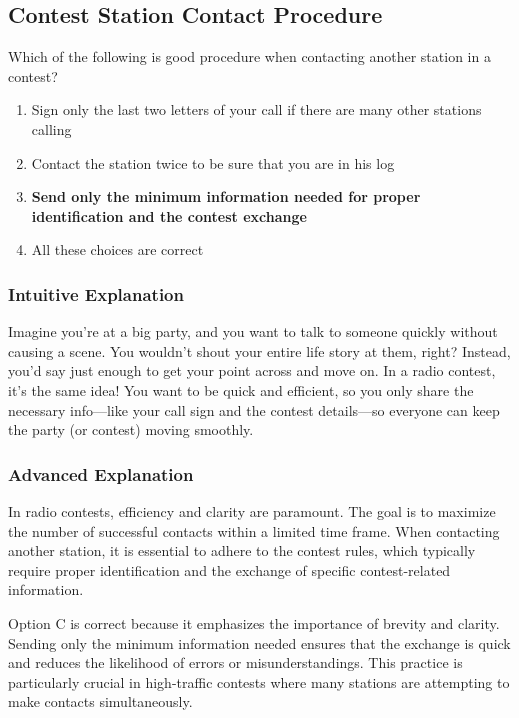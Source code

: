 \subsection{Contest Station Contact Procedure}
\label{T8C04}

\begin{tcolorbox}[colback=gray!10!white,colframe=black!75!black,title=T8C04]
Which of the following is good procedure when contacting another station in a contest?
\begin{enumerate}[label=\Alph*)]
    \item Sign only the last two letters of your call if there are many other stations calling
    \item Contact the station twice to be sure that you are in his log
    \item \textbf{Send only the minimum information needed for proper identification and the contest exchange}
    \item All these choices are correct
\end{enumerate}
\end{tcolorbox}

\subsubsection{Intuitive Explanation}
Imagine you're at a big party, and you want to talk to someone quickly without causing a scene. You wouldn't shout your entire life story at them, right? Instead, you'd say just enough to get your point across and move on. In a radio contest, it's the same idea! You want to be quick and efficient, so you only share the necessary info—like your call sign and the contest details—so everyone can keep the party (or contest) moving smoothly.

\subsubsection{Advanced Explanation}
In radio contests, efficiency and clarity are paramount. The goal is to maximize the number of successful contacts within a limited time frame. When contacting another station, it is essential to adhere to the contest rules, which typically require proper identification and the exchange of specific contest-related information. 

Option C is correct because it emphasizes the importance of brevity and clarity. Sending only the minimum information needed ensures that the exchange is quick and reduces the likelihood of errors or misunderstandings. This practice is particularly crucial in high-traffic contests where many stations are attempting to make contacts simultaneously.


